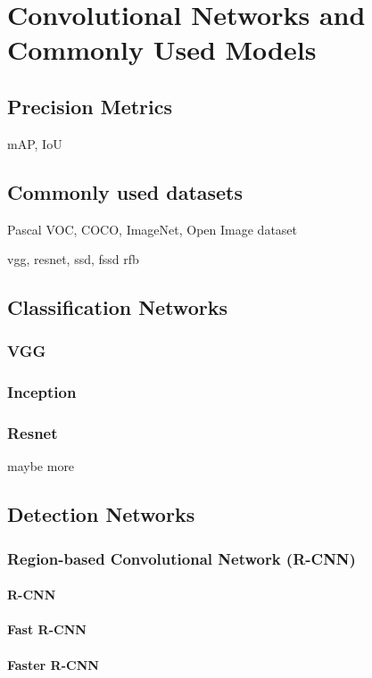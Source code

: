 \chapter{Convolutional Networks and Commonly Used Models}
\label{chapt:models}
\section{Precision Metrics}
mAP, IoU

\section{Commonly used datasets}
Pascal VOC, COCO, ImageNet, Open Image dataset

 vgg, resnet, ssd, fssd rfb

\section{Classification Networks}
\subsection{VGG}
\subsection{Inception}
\subsection{Resnet}
maybe more

\section{Detection Networks}

\subsection{Region-based Convolutional Network (R-CNN)}
\subsubsection{R-CNN}
\subsubsection{Fast R-CNN}
\subsubsection{Faster R-CNN}

